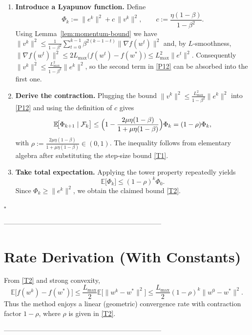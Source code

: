 \documentclass{article}
\newcommand{\E}{\mathbb{E}}
\begin{document}
\begin{enumerate}[label=[Step \arabic*], leftmargin=*]
\item \textbf{Introduce a Lyapunov function.}  
Define
\[
\Phi_{k}:=\|e^{k}\|^{2}+c\,\|v^{k}\|^{2},
\qquad
c:=\frac{\eta(1-\beta)}{1-\beta^{2}}.
\tag{P13}
\]
Using Lemma~\ref{lem:momentum-bound} we have
$\|v^{k}\|^{2}\le \frac{1}{1-\beta^{2}}\sum_{t=0}^{k-1}\beta^{2(k-1-t)}\|\nabla f(w^{t})\|^{2}$
and, by $L$‑smoothness,
$\|\nabla f(w^{t})\|^{2}\le 2L_{\max}\bigl(f(w^{t})-f(w^{*})\bigr)
\le L_{\max}^{2}\|e^{t}\|^{2}$.
Consequently $\|v^{k}\|^{2}\le \frac{L_{\max}^{2}}{1-\beta^{2}}\|e^{k}\|^{2}$,
so the second term in \eqref{P12} can be absorbed into the first one.

\item \textbf{Derive the contraction.}  
Plugging the bound $\|v^{k}\|^{2}\le \frac{L_{\max}^{2}}{1-\beta^{2}}\|e^{k}\|^{2}$
into \eqref{P12} and using the definition of $c$ gives
\[
\E\!\bigl[\Phi_{k+1}\mid\mathcal{F}_{k}\bigr]
\le \Bigl(1-\frac{2\mu\eta(1-\beta)}{1+\mu\eta(1-\beta)}\Bigr)\Phi_{k}
= (1-\rho)\Phi_{k},
\]
with $\displaystyle\rho:=\frac{2\mu\eta(1-\beta)}{1+\mu\eta(1-\beta)}\in(0,1)$.
The inequality follows from elementary algebra after substituting the
step‑size bound \eqref{T1}.

\item \textbf{Take total expectation.}  
Applying the tower property repeatedly yields
\[
\E\!\bigl[\Phi_{k}\bigr]\le (1-\rho)^{k}\Phi_{0}.
\]
Since $\Phi_{k}\ge\|e^{k}\|^{2}$, we obtain the claimed bound \eqref{T2}.
\end{enumerate}
\hfill $\square$

---------------------------------------------------------------------

\section*{Rate Derivation (With Constants)}
From \eqref{T2} and strong convexity,
\[
\E\!\bigl[f(w^{k})-f(w^{*})\bigr]
\le \frac{L_{\max}}{2}\E\!\bigl[\|w^{k}-w^{*}\|^{2}\bigr]
\le \frac{L_{\max}}{2}(1-\rho)^{k}\|w^{0}-w^{*}\|^{2}.
\]
Thus the method enjoys a linear (geometric) convergence rate with contraction
factor $1-\rho$, where $\rho$ is given in \eqref{T2}.

---------------------------------------------------------------------
\end{document}
